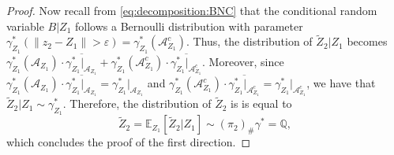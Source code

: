 \documentclass[11pt,a4paper]{article}
\begin{document}
\begin{proof}
Now recall from \eqref{eq:decomposition:BNC} that the conditional random variable $B|Z_1$ follows a Bernoulli distribution with parameter $\gamma^*_{Z_1} \left(\|z_2-Z_1\|>\varepsilon \right) = \gamma^*_{Z_1} (\mathcal A_{Z_1}^c)$. Thus, the distribution of $\widetilde{Z}_2|Z_1$ becomes $\gamma^*_{Z_1} (\mathcal A_{Z_1}) \cdot \overline{\gamma^*_{Z_1}|_{\mathcal A_{Z_1}}} + \gamma^*_{Z_1} (\mathcal A_{Z_1}^c) \cdot \overline{\gamma^*_{Z_1}|_{\mathcal A_{Z_1}^c}}$. Moreover, since $\gamma^*_{Z_1} (\mathcal A_{Z_1}) \cdot \overline{\gamma^*_{Z_1}|_{\mathcal A_{Z_1}}} = \gamma^*_{Z_1}|_{\mathcal A_{Z_1}}$ and $\gamma^*_{Z_1} (\mathcal A_{Z_1}^c) \cdot \overline{\gamma^*_{Z_1}|_{\mathcal A_{Z_1}^c}} = \gamma^*_{Z_1}|_{\mathcal A_{Z_1}^c}$, we have that $ \widetilde{Z}_2|Z_1\sim \gamma^*_{Z_1}.$
Therefore, the distribution of $\widetilde{Z}_2$ is is equal to
\begin{equation*}
    \widetilde{Z}_2 = \mathbb E_{Z_1}[\widetilde{Z}_2|Z_1] \sim(\pi_2)_\#\gamma^* = \mathbb Q,
\end{equation*}
which concludes the proof of the first direction.


\end{proof}
\end{document}
